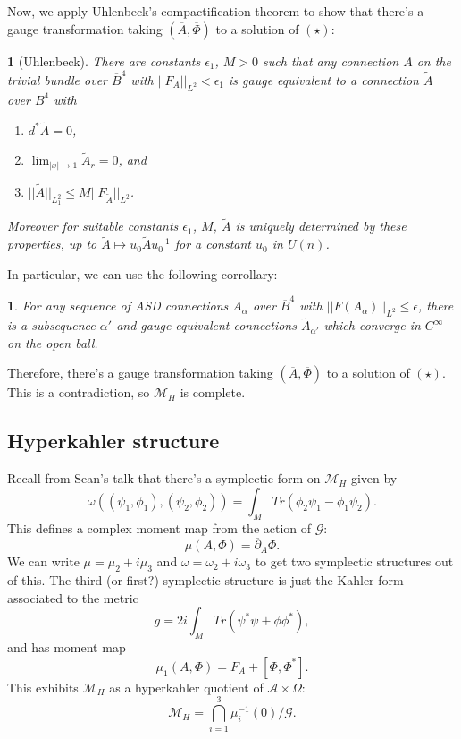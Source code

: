 \documentclass[oneside,english]{amsbook}
\numberwithin{section}{chapter}
\numberwithin{equation}{section}
\numberwithin{figure}{section}
\theoremstyle{plain}
\newtheorem{thm}{\protect\theoremname}
\theoremstyle{definition}
\theoremstyle{remark}
\theoremstyle{definition}
\theoremstyle{definition}
\theoremstyle{plain}
\newtheorem*{cor*}{\protect\corollaryname}
\providecommand{\corollaryname}{Corollary}
\providecommand{\theoremname}{Theorem}
\begin{document}
Now, we apply Uhlenbeck's compactification theorem to show that there's
a gauge transformation taking $\left(\overline{A},\overline{\Phi}\right)$
to a solution of $(\star)$:
\begin{thm}
[Uhlenbeck] There are constants $\epsilon_{1}$, $M>0$ such that
any connection $A$ on the trivial bundle over $\overline{B}^{4}$
with $||F_{A}||_{L^{2}}<\epsilon_{1}$ is gauge equivalent to a connection
$\tilde{A}$ over $B^{4}$ with 
\begin{enumerate}
\item $d^{*}\tilde{A}=0$,
\item $\lim_{\left|x\right|\rightarrow1}\tilde{A}_{r}=0$, and 
\item $||\tilde{A}||_{L_{1}^{2}}\leq M||F_{\tilde{A}}||_{L^{2}}$. 
\end{enumerate}
Moreover for suitable constants $\epsilon_{1}$, $M$, $\tilde{A}$
is uniquely determined by these properties, up to $\tilde{A}\mapsto u_{0}\tilde{A}u_{0}^{-1}$
for a constant $u_{0}$ in $U\left(n\right)$.
\end{thm}
In particular, we can use the following corrollary:
\begin{cor*}
For any sequence of ASD connections $A_{\alpha}$ over $\overline{B}^{4}$
with $||F\left(A_{\alpha}\right)||_{L^{2}}\leq\epsilon$, there is
a subsequence $\alpha'$ and gauge equivalent connections $\tilde{A}_{\alpha'}$
which converge in $C^{\infty}$ on the open ball. 
\end{cor*}
Therefore, there's a gauge transformation taking $\left(\overline{A},\overline{\Phi}\right)$
to a solution of $(\star)$. This is a contradiction, so $\mathcal{M}_{H}$
is complete. 


\subsection{Hyperkahler structure}

Recall from Sean's talk that there's a symplectic form on $\mathcal{M}_{H}$
given by 
\[
\omega\left((\psi_{1},\phi_{1}),\left(\psi_{2},\phi_{2}\right)\right)=\int_{M}Tr\left(\phi_{2}\psi_{1}-\phi_{1}\psi_{2}\right).
\]
This defines a complex moment map from the action of $\mathcal{G}$:
\[
\mu\left(A,\Phi\right)=\overline{\partial}_{A}\Phi.
\]
We can write $\mu=\mu_{2}+i\mu_{3}$ and $\omega=\omega_{2}+i\omega_{3}$
to get two symplectic structures out of this. The third (or first?)
symplectic structure is just the Kahler form associated to the metric
\[
g=2i\int_{M}Tr\left(\psi^{*}\psi+\phi\phi^{*}\right),
\]
and has moment map 
\[
\mu_{1}\left(A,\Phi\right)=F_{A}+\left[\Phi,\Phi^{*}\right].
\]
This exhibits $\mathcal{M}_{H}$ as a hyperkahler quotient of $\mathcal{A}\times\Omega$:
\[
\mathcal{M}_{H}=\bigcap_{i=1}^{3}\mu_{i}^{-1}\left(0\right)/\mathcal{G}.
\]
\end{document}
